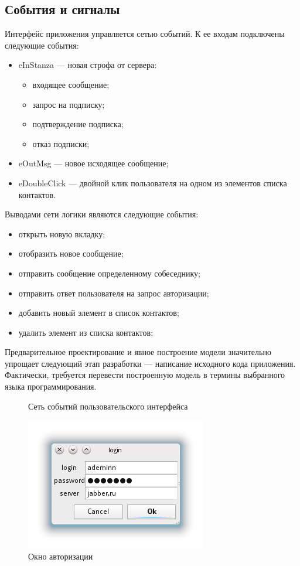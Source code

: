 \subsection{События и сигналы}\label{events_and_signals}
Интерфейс приложения управляется сетью событий.
К ее входам подключены следующие события:
\begin{itemize}
    \item eInStanza --- новая строфа от сервера:
    \begin{itemize}
        \item входящее сообщение;
        \item запрос на подписку;
        \item подтверждение подписка;
        \item отказ подписки;
    \end{itemize}
    \item eOutMsg --- новое исходящее сообщение;
    \item eDoubleClick --- двойной клик пользователя на одном из элементов списка контактов.
\end{itemize}
Выводами сети логики являются следующие события:
\begin{itemize}
    \item открыть новую вкладку;
    \item отобразить новое сообщение;
    \item отправить сообщение определенному собеседнику;
    \item отправить ответ пользователя на запрос авторизации;
    \item добавить новый элемент в список контактов;
    \item удалить элемент из списка контактов;
\end{itemize}

Предварительное проектирование и явное построение модели значительно упрощает следующий этап разработки --- написание исходного кода приложения.
Фактически, требуется перевести построенную модель в термины выбранного языка программирования.

\begin{figure}[р]
\centering

\caption{Сеть событий пользовательского интерфейса}
\label{network}
\end{figure}

\begin{figure}[p]
\centering
\includegraphics{pic/login.png}
\caption{Окно авторизации}
\label{pic:login}
\end{figure}

